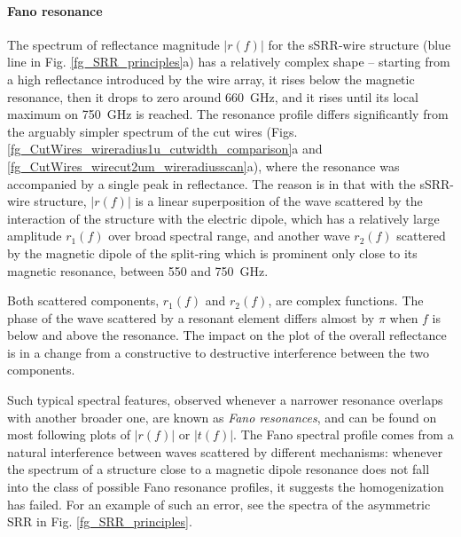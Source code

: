 \paragraph{Fano resonance} %
The spectrum of reflectance magnitude $|r(f)|$ for the sSRR-wire structure (blue line in Fig. \ref{fg_SRR_principles}a) has a relatively complex shape -- starting from a high reflectance introduced by the wire array, it rises below the magnetic resonance, then it drops to zero around 660~GHz, and it rises until its local maximum on 750~GHz is reached.
The resonance profile differs significantly from the arguably simpler spectrum of the cut wires (Figs. \ref{fg_CutWires_wireradius1u_cutwidth_comparison}a and \ref{fg_CutWires_wirecut2um_wireradiusscan}a), where the resonance was accompanied by a single peak in reflectance. 
The reason is in that with the sSRR-wire structure, $|r(f)|$ is a linear superposition of the wave scattered by the interaction of the structure with the electric dipole, which has a relatively large amplitude $r_{1}(f)$ over broad spectral range, and another wave $r_{2}(f)$ scattered by the magnetic dipole of the split-ring which is prominent only close to its magnetic resonance, between 550 and 750~GHz.

Both scattered components, $r_1(f)$ and $r_2(f)$, are complex functions. The phase of the wave scattered by a resonant element differs almost by $\pi$ when $f$ is below and above the resonance. The impact on the plot of the overall reflectance is in a change from a constructive to destructive interference between the two components. 

Such typical spectral features, observed whenever a narrower resonance overlaps with another broader one, are known as \textit{Fano resonances}, and can be found on most following plots of $|r(f)|$ or $|t(f)|$. The Fano spectral profile comes from a natural interference between waves scattered by different mechanisms: whenever the spectrum of a structure close to a magnetic dipole resonance does not fall into the class of possible Fano resonance profiles, it suggests the homogenization has failed. For an example of such an error, see the spectra of the asymmetric SRR in Fig. \ref{fg_SRR_principles}.  

